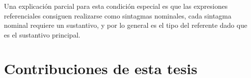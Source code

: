 Una explicaci\'on parcial para esta condici\'on especial es que las expresiones referenciales consiguen realizarse como sintagmas nominales,
cada sintagma nominal requiere un sustantivo, y por lo general es el tipo del referente dado que es el sustantivo principal.\\
%
%

\section{Contribuciones de esta tesis}
\label{sec:contribiciones}

